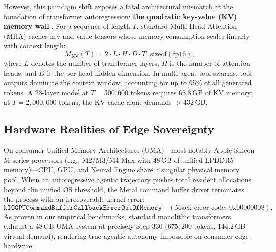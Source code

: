 \documentclass[11pt,letterpaper]{article}
\theoremstyle{definition}
\begin{document}
However, this paradigm shift exposes a fatal architectural mismatch at the foundation of transformer autoregression: \textbf{the quadratic key-value (KV) memory wall} \cite{vaswani2017attention, xiao2023streamingllm}. For a sequence of length $T$, standard Multi-Head Attention (MHA) caches key and value tensors whose memory consumption scales linearly with context length:
\begin{equation}
    M_{\text{KV}}(T) = 2 \cdot L \cdot H \cdot D \cdot T \cdot \text{sizeof}(\text{fp16}),
\end{equation}
where $L$ denotes the number of transformer layers, $H$ is the number of attention heads, and $D$ is the per-head hidden dimension. In multi-agent tool swarms, tool outputs dominate the context window, accounting for up to 95\% of all generated tokens. A 28-layer model at $T = 300,000$ tokens requires $65.8$\,GB of KV memory; at $T = 2,000,000$ tokens, the KV cache alone demands $>432$\,GB.

\subsection{Hardware Realities of Edge Sovereignty}
On consumer Unified Memory Architectures (UMA)---most notably Apple Silicon M-series processors (e.g., M2/M3/M4 Max with 48\,GB of unified LPDDR5 memory)---CPU, GPU, and Neural Engine share a singular physical memory pool. When an autoregressive agentic trajectory pushes total resident allocations beyond the unified OS threshold, the Metal command buffer driver terminates the process with an irrecoverable kernel error:
\begin{equation}
    \texttt{kIOGPUCommandBufferCallbackErrorOutOfMemory} \quad (\text{Mach error code: } 0\text{x}00000008).
\end{equation}
As proven in our empirical benchmarks, standard monolithic transformers exhaust a 48\,GB UMA system at precisely Step 330 ($675,200$ tokens, $144.2$\,GB virtual demand), rendering true agentic autonomy impossible on consumer edge hardware.
\end{document}
